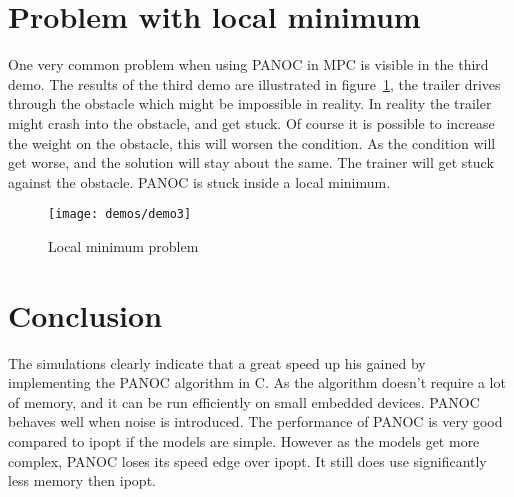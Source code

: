\section{Problem with local minimum}
One very common problem when using PANOC in MPC is visible in the third demo. The results of the third demo are illustrated in figure~\ref{fig:demo: local minimum problem}, the trailer drives through the obstacle which might be impossible in reality. In reality the trailer might crash into the obstacle, and get stuck. Of course it is possible to increase the weight on the obstacle, this will worsen the condition. As the condition will get worse, and the solution will stay about the same. The trainer will get stuck against the obstacle. PANOC is stuck inside a local minimum.

\begin{figure}[H]
	\centering
	\texttt{[image: demos/demo3]}
	\caption{Local minimum problem}
	\label{fig:demo: local minimum problem}
\end{figure}

\section{Conclusion}

The simulations clearly indicate that a great speed up his gained by implementing the PANOC algorithm in C. As the algorithm doesn't require a lot of memory, and it can be run efficiently on small embedded devices. PANOC behaves well when noise is introduced. The performance of PANOC is very good compared to ipopt if the models are simple. However as the models get more complex, PANOC loses its speed edge over ipopt. It still does use significantly less memory then ipopt.